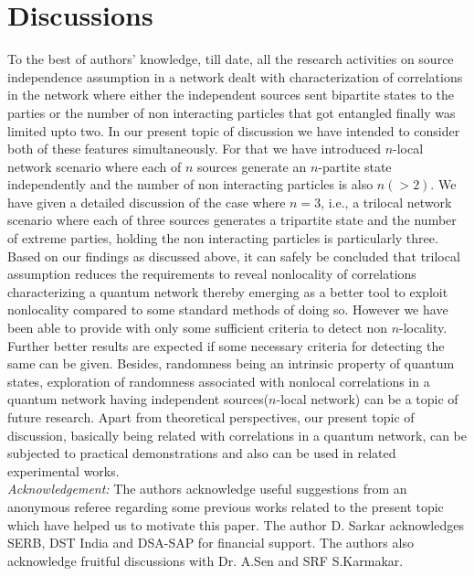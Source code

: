 \documentclass[pra,10pt,twocolumn,superscriptaddress,floatfix,showpacs]{revtex4-1}
\begin{document}
\section{Discussions}\label{dis}
To the best of authors' knowledge, till date, all the research activities on source independence assumption in a network dealt with characterization of correlations in the network where either the independent sources sent bipartite states to the parties\cite{BRAN,Tav} or the number of non interacting particles that got entangled finally was limited upto two\cite{raf}. In our present topic of discussion we have intended to consider both of these features simultaneously. For that we have introduced $n$-local network scenario where each of $n$ sources generate an $n$-partite state independently and the number of non interacting particles is also $n(>2)$. We have given a detailed discussion of the case where $n=3$, i.e., a trilocal network scenario where each of three sources generates a tripartite state and the number of extreme parties, holding the non interacting particles is particularly three. Based on  our findings as discussed above, it can safely be concluded that trilocal assumption reduces the requirements to reveal nonlocality of correlations characterizing a quantum network thereby emerging as a better tool to exploit nonlocality compared to some standard methods of doing so. However we have been able to provide with only some sufficient criteria to detect non $n$-locality. Further better results are expected if some necessary criteria for detecting the same can be given. Besides, randomness being an intrinsic property of quantum states, exploration of randomness associated with nonlocal correlations in a quantum network having independent sources($n$-local network) can be a topic of future research. Apart from theoretical perspectives, our present topic of discussion, basically being related with correlations in a quantum network, can be subjected to practical demonstrations and also can be used in related  experimental works\cite{ex1,ex2}.\\
 \textit{Acknowledgement:}
The authors acknowledge useful suggestions from an anonymous referee regarding some previous works related to the present topic  which have helped us to motivate this paper. The author D. Sarkar  acknowledges SERB, DST  India and DSA-SAP for financial support. The authors also acknowledge  fruitful discussions with Dr. A.Sen and SRF S.Karmakar.
\end{document}
